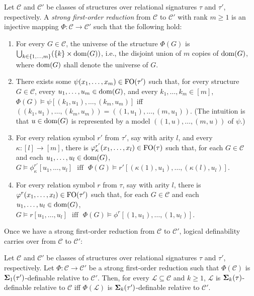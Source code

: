 \documentclass{LMCS}
\begin{document}
\begin{defi}\label{def:reduction} Let
  $\mathcal{C}$ and $\mathcal{C}'$ be classes of structures over relational
  signatures $\tau$ and $\tau'$, respectively. A \emph{strong first-order
    reduction} from $\mathcal{C}$ to $\mathcal{C}'$ with rank $m \ge 1$ is an
  injective mapping $\Phi: \mathcal{C} \rightarrow \mathcal{C}'$ such that the
  following hold:
\begin{enumerate}[(1)]
\item For every $G \in \mathcal{C}$, the universe of the structure $\Phi(G)$
  is $\bigcup_{k \in \{1,\ldots,m\}} (\{k\} \times \mathrm{dom}(G))$, i.e., the
  disjoint union of $m$ copies of $\mathrm{dom}(G)$, where $\mathrm{dom}(G)$ shall denote the
  universe of $G$.
\item There exists some $\psi(x_1,\ldots,x_m) \in \textup{FO}(\tau')$ such that, for every
  structure $G \in \mathcal{C}$, every $u_1,\ldots,u_m \in \mathrm{dom}(G)$, and every
  $k_1,\ldots,k_m \in [m]$, $\Phi(G) \models \psi[(k_1,u_1),\ldots,(k_m,u_m)]$
  iff $((k_1,u_1),\ldots,(k_m,u_m)) = ((1,u_1),\ldots,(m,u_1))$. (The
  intuition is that $u \in
  \mathrm{dom}(G)$ is represented by a model $((1,u),\ldots,(m,u))$ of $\psi$.)
\item For every relation symbol $r'$ from $\tau'$, say with arity $l$, and every
  $\kappa: [l] \rightarrow [m]$, there is $\varphi^{r'}_\kappa(x_1,\ldots,x_l)
  \in \textup{FO}(\tau)$ such that, for each $G \in \mathcal{C}$ and each
  $u_1,\ldots,u_l \in \mathrm{dom}(G)$, $G \models \phi^{r'}_\kappa[u_1,\ldots,u_l]
  \text{~~iff~~} \Phi(G) \models r'[(\kappa(1),u_1),\ldots,(\kappa(l),u_l)]$.
\item For every relation symbol $r $ from $\tau$, say with arity $l$, there is
  $\varphi^{r}(x_1,\ldots,x_l) \in \textup{FO}(\tau')$ such that, for each $G \in
  \mathcal{C}$ and each $u_1,\ldots,u_l \in \mathrm{dom}(G)$, $G \models
  r[u_1,\ldots,u_l] \text{~~iff~~} \Phi(G) \models
  \phi^r[(1,u_1),\ldots,(1,u_l)]$.
\end{enumerate}
\end{defi}

Once we have a strong first-order reduction from $\mathcal{C}$ to
$\mathcal{C}'$, logical definability carries over from $\mathcal{C}$ to
$\mathcal{C}'$:

\begin{thm}\label{thm:sfor} Let $\mathcal{C}$ and
  $\mathcal{C}'$ be classes of structures over relational signatures $\tau$
  and $\tau'$, respectively. Let $\Phi: \mathcal{C} \rightarrow \mathcal{C}'$
  be a strong first-order reduction such that $\Phi(\mathcal{C})$ is
  ${\bf{\Sigma}}_1(\tau')$-definable relative to $\mathcal{C}'$. Then, for every
  $\mathcal{L} \subseteq \mathcal{C}$ and $k \ge 1$, $\mathcal{L}$ is
  ${\bf{\Sigma}}_k(\tau)$-definable relative to $\mathcal{C}$ iff
  $\Phi(\mathcal{L})$ is ${\bf{\Sigma}}_k(\tau')$-definable relative to
  $\mathcal{C}'$.
\end{thm}
\end{document}
